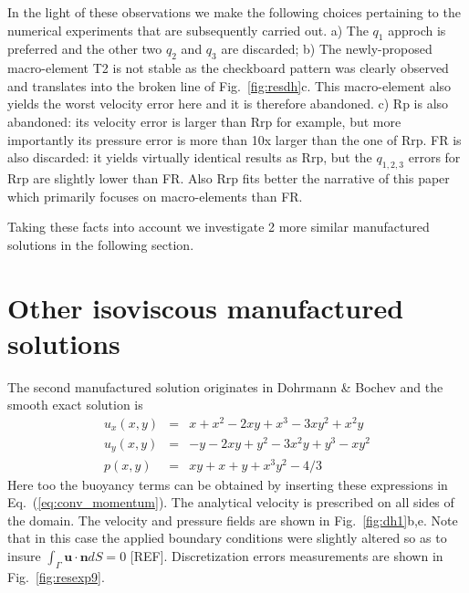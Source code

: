 \documentclass[a4paper,12pt]{article}
\begin{document}

In the light of these observations we make the following choices pertaining to the 
numerical experiments that are subsequently carried out.
a) The $q_1$ approch is preferred and the other two $q_2$ and $q_3$ are discarded;
b) The newly-proposed macro-element T2 is not stable as the checkboard pattern was clearly observed
and translates into the broken line of Fig.~\ref{fig:resdh}c. This macro-element also yields the worst 
velocity error here and it is therefore abandoned. 
c) Rp is also abandoned: its velocity error is larger than Rrp for example, but 
more importantly its pressure error is more than 10x larger than the one of Rrp.
FR is also discarded: it yields virtually identical results as Rrp, but the $q_{1,2,3}$ errors for Rrp 
are slightly lower than FR. Also Rrp fits better the narrative of this paper  
which primarily focuses on macro-elements than FR.

Taking these facts into account we investigate 2 more similar manufactured solutions 
in the following section. 

\section{Other isoviscous manufactured solutions}


The second manufactured solution originates in Dohrmann \& Bochev \cite{dobo04} 
and the smooth exact solution is
\begin{eqnarray}
u_x(x,y) &=& x+x^2 - 2xy+x^3 - 3xy^2 + x^2y \\
u_y(x,y) &=& -y-2xy+y^2 -3x^2y + y^3 - xy^2 \\
p(x,y) &=& xy+x+y+x^3y^2 - 4/3
\end{eqnarray}
Here too the buoyancy terms can be obtained by inserting these expressions
in Eq.~(\ref{eq:conv_momentum}).
The analytical velocity is prescribed on all sides of the domain.
The velocity and pressure fields are shown in Fig.~\ref{fig:dh1}b,e.
Note that in this case the applied boundary conditions were slightly
altered so as to insure $\int_\Gamma {\bm u}\cdot{\bm n} dS =0$ [REF].
Discretization errors measurements are shown in Fig.~\ref{fig:resexp9}.
\end{document}
